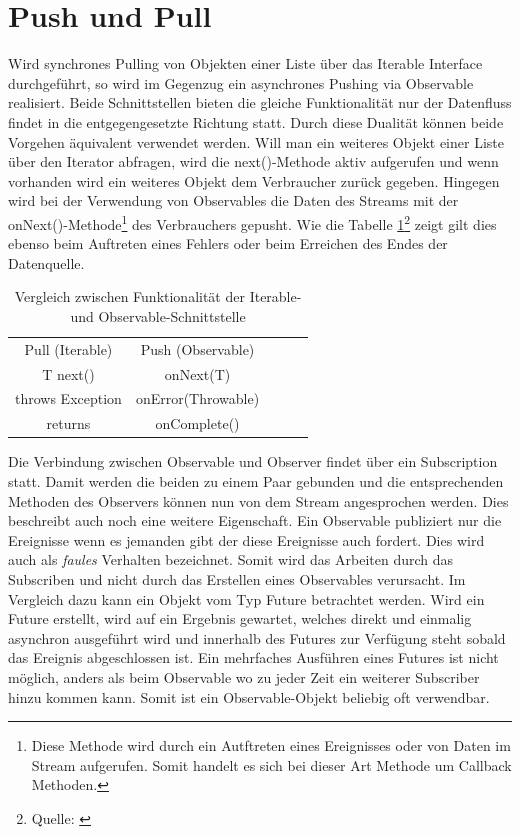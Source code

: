 \section{Push und Pull}
Wird synchrones Pulling von Objekten einer Liste über das Iterable Interface durchgeführt, so wird im Gegenzug ein asynchrones Pushing via Observable realisiert. Beide Schnittstellen bieten die gleiche Funktionalität nur der Datenfluss findet in die entgegengesetzte Richtung statt. Durch diese Dualität können beide Vorgehen äquivalent verwendet werden. Will man ein weiteres Objekt einer Liste über den Iterator abfragen, wird die next()-Methode aktiv aufgerufen und wenn vorhanden wird ein weiteres Objekt dem Verbraucher zurück gegeben. Hingegen wird bei der Verwendung von Observables die Daten des Streams mit der onNext()-Methode\footnote{Diese Methode wird durch ein Autftreten eines Ereignisses oder von Daten im Stream aufgerufen. Somit handelt es sich bei dieser Art Methode um Callback Methoden.} des Verbrauchers gepusht. Wie die Tabelle \ref{tbl.vglIterObs}\footnote{Quelle: \cite{reactivex.io}} zeigt gilt dies ebenso beim Auftreten eines Fehlers oder beim Erreichen des Endes der Datenquelle.
\begin{table}[]
	\centering
	\begin{tabular}{|c|c|lll}
		\cline{1-2}
		\cellcolor[HTML]{C0C0C0}Pull (Iterable) & \cellcolor[HTML]{C0C0C0}Push (Observable) &  &  &  \\ \cline{1-2}
		T next()                                & onNext(T)                                 &  &  &  \\ \cline{1-2}
		throws Exception                        & onError(Throwable)                        &  &  &  \\ \cline{1-2}
		returns                                 & onComplete()                             &  &  &  \\ \cline{1-2}
	\end{tabular}
	\caption{Vergleich zwischen Funktionalität der Iterable- und Observable-Schnittstelle}
	\label{tbl.vglIterObs}
\end{table}
Die Verbindung zwischen Observable und Observer findet über ein Subscription statt. Damit werden die beiden zu einem Paar gebunden und die entsprechenden Methoden des Observers können nun von dem Stream angesprochen werden. Dies beschreibt auch noch eine weitere Eigenschaft. Ein Observable publiziert nur die Ereignisse wenn es jemanden gibt der diese Ereignisse auch fordert. Dies wird auch als \textit{faules} Verhalten bezeichnet. Somit wird das Arbeiten durch das Subscriben und nicht durch das Erstellen eines Observables verursacht. Im Vergleich dazu kann ein Objekt vom Typ Future betrachtet werden. Wird ein Future erstellt, wird auf ein Ergebnis gewartet, welches direkt und einmalig asynchron ausgeführt wird und innerhalb des Futures zur Verfügung steht sobald das Ereignis abgeschlossen ist. Ein mehrfaches Ausführen eines Futures ist nicht möglich, anders als beim Observable wo zu jeder Zeit ein weiterer Subscriber hinzu kommen kann. Somit ist ein Observable-Objekt beliebig oft verwendbar. 
